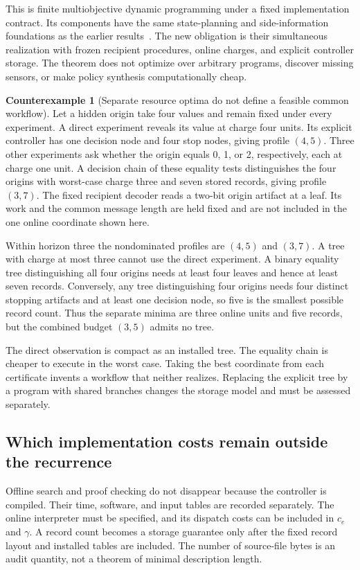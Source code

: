 \documentclass[11pt,letterpaper]{article}
\theoremstyle{plain}
\theoremstyle{definition}
\newtheorem{counterexample}[theorem]{Counterexample}
\begin{document}
This is finite multiobjective dynamic programming under a fixed implementation contract. Its components have the same state-planning and side-information foundations as the earlier results~\cite{smallwood,witsenhausen,alon}. The new obligation is their simultaneous realization with frozen recipient procedures, online charges, and explicit controller storage. The theorem does not optimize over arbitrary programs, discover missing sensors, or make policy synthesis computationally cheap.

\begin{counterexample}[Separate resource optima do not define a feasible common workflow]\label{ex:resource-frontier}
Let a hidden origin take four values and remain fixed under every experiment. A direct experiment reveals its value at charge four units. Its explicit controller has one decision node and four stop nodes, giving profile $(4,5)$. Three other experiments ask whether the origin equals 0, 1, or 2, respectively, each at charge one unit. A decision chain of these equality tests distinguishes the four origins with worst-case charge three and seven stored records, giving profile $(3,7)$. The fixed recipient decoder reads a two-bit origin artifact at a leaf. Its work and the common message length are held fixed and are not included in the one online coordinate shown here.

Within horizon three the nondominated profiles are $(4,5)$ and $(3,7)$. A tree with charge at most three cannot use the direct experiment. A binary equality tree distinguishing all four origins needs at least four leaves and hence at least seven records. Conversely, any tree distinguishing four origins needs four distinct stopping artifacts and at least one decision node, so five is the smallest possible record count. Thus the separate minima are three online units and five records, but the combined budget $(3,5)$ admits no tree.
\end{counterexample}

The direct observation is compact as an installed tree. The equality chain is cheaper to execute in the worst case. Taking the best coordinate from each certificate invents a workflow that neither realizes. Replacing the explicit tree by a program with shared branches changes the storage model and must be assessed separately.

\subsection{Which implementation costs remain outside the recurrence}
Offline search and proof checking do not disappear because the controller is compiled. Their time, software, and input tables are recorded separately. The online interpreter must be specified, and its dispatch costs can be included in $c_e$ and $\gamma$. A record count becomes a storage guarantee only after the fixed record layout and installed tables are included. The number of source-file bytes is an audit quantity, not a theorem of minimal description length.
\end{document}
